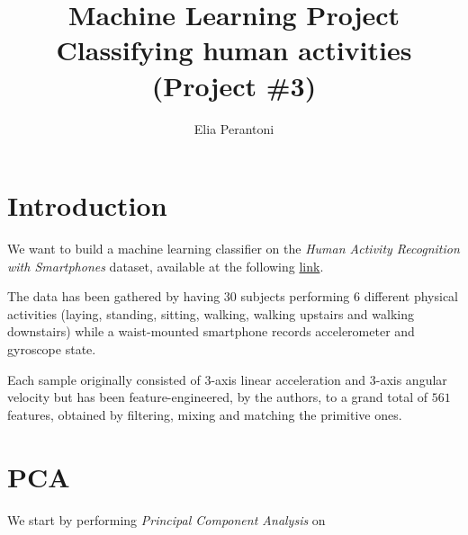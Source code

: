 \documentclass[14pt]{extarticle}
\begin{document}
    \author{Elia Perantoni}
    \title{ Machine Learning Project \\
        \large Classifying human activities \\
        (Project \#3) }
    \maketitle

    \section{Introduction}
    We want to build a machine learning classifier on the \emph{Human Activity
    Recognition with Smartphones} dataset, available at the following
    \href{https://www.kaggle.com/datasets/uciml/human-activity-recognition-with-smartphones}{link}.

    The data has been gathered by having $30$ subjects performing $6$ different
    physical activities (laying, standing, sitting, walking, walking upstairs
    and walking downstairs) while a waist-mounted smartphone records
    accelerometer and gyroscope state.

    Each sample originally consisted of $3$-axis linear acceleration and
    $3$-axis angular velocity but has been feature-engineered, by the authors,
    to a grand total of $561$ features, obtained by filtering, mixing and
    matching the primitive ones.

    \section{PCA}
    We start by performing \emph{Principal Component Analysis} on 
\end{document}
